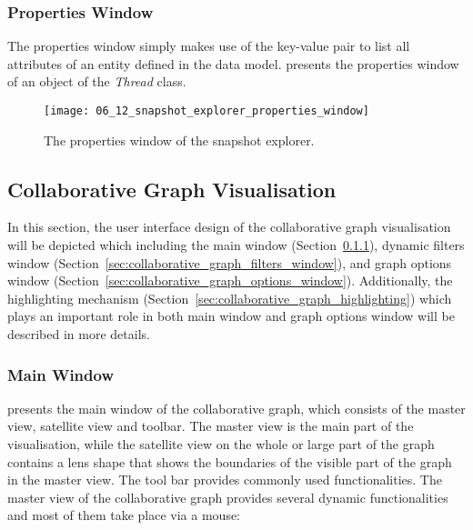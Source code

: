 \subsubsection{Properties Window}
The properties window simply makes use of the key-value pair to list all attributes of an entity defined in the data model.  presents the properties window of an object of the \emph{Thread} class.

\begin{figure}[!htb]
  \centering
  \texttt{[image: 06\_12\_snapshot\_explorer\_properties\_window]}
  \caption{The properties window of the snapshot explorer.}
  \label{Figure:06_12}
\end{figure}

\subsection{Collaborative Graph Visualisation}
In this section, the user interface design of the collaborative graph visualisation will be depicted which including the main window (Section~\ref{sec:collaborative_graph_main_window}), dynamic filters window (Section~\ref{sec:collaborative_graph_filters_window}), and graph options window (Section~\ref{sec:collaborative_graph_options_window}). Additionally, the highlighting mechanism (Section~\ref{sec:collaborative_graph_highlighting}) which plays an important role in both main window and graph options window will be described in more details.

\subsubsection{Main Window} \label{sec:collaborative_graph_main_window}
 presents the main window of the collaborative graph, which consists of the master view, satellite view and toolbar. The master view is the main part of the visualisation, while the satellite view on the whole or large part of the graph contains a lens shape that shows the boundaries of the visible part of the graph in the master view. The tool bar provides commonly used functionalities. The master view of the collaborative graph provides several dynamic functionalities and most of them take place via a mouse:

